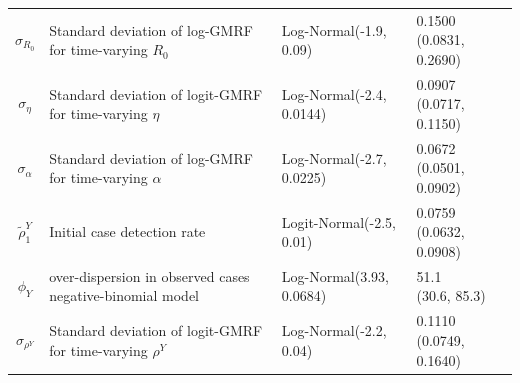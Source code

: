 \begin{table}
\begin{tabularx}{\columnwidth}{c>{\RaggedRight}Xllc}
$\sigma_{R_0}$ & Standard deviation of log-GMRF for time-varying $R_0$ & Log-Normal(-1.9, 0.09) & \makecell{0.1500 \\ (0.0831, 0.2690)} & \\
$\sigma_\eta$ & Standard deviation of logit-GMRF for time-varying $\eta$ & Log-Normal(-2.4, 0.0144) & \makecell{0.0907 \\ (0.0717, 0.1150)} & \\
$\sigma_\alpha$ & Standard deviation of log-GMRF for time-varying $\alpha$ & Log-Normal(-2.7, 0.0225) & \makecell{0.0672 \\ (0.0501, 0.0902)} & \\
\hline
$\tilde{\rho}^Y_1$ & Initial case detection rate & Logit-Normal(-2.5, 0.01) & \makecell{0.0759 \\ (0.0632, 0.0908)} & \cite{Bruckner2021} \\
$\phi_Y$ & over-dispersion in observed cases negative-binomial model & Log-Normal(3.93, 0.0684) & \makecell{51.1 \\ (30.6, 85.3)} & \\
$\sigma_{\rho^Y}$ & Standard deviation of logit-GMRF for time-varying $\rho^Y$ & Log-Normal(-2.2, 0.04) & \makecell{0.1110 \\ (0.0749, 0.1640)} &
\end{tabularx}
\end{table}

